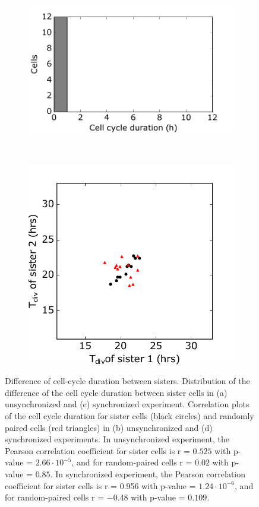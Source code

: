 \documentclass[pdftex,12pt,a4paper]{report}
\begin{document}
\begin{figure}[H]
\centering

\begin{subfigure}{.4\textwidth}
  \centering
  \includegraphics[width=\textwidth]{images/ccd_hist_syn.pdf}
  \caption{}
  \label{fig:ccd_hist_syn}
\end{subfigure}
~
\begin{subfigure}{.4\textwidth}
  \centering
  \includegraphics[width=\textwidth]{images/ccd_scatter_syn.pdf}
  \caption{}
  \label{fig:ccd_scatter_syn}
\end{subfigure}
\caption[Difference of cell-cycle duration between sisters]{Difference of cell-cycle duration between sisters. Distribution of the difference of the cell cycle duration between sister cells in (a) unsynchronized and (c) synchronized experiment. Correlation plots of the cell cycle duration for sister cells (black circles) and randomly paired cells (red  triangles) in (b) unsynchronized and (d) synchronized experiments. In unsynchronized experiment, the Pearson correlation coefficient for sister cells is r = $0.525$ with p-value = $2.66 \cdot 10^{-5}$, and for random-paired cells r = $0.02$ with p-value = $0.85$.  In synchronized experiment, the Pearson correlation coefficient for sister cells is r = 0.956 with p-value = $1.24 \cdot 10^{-6}$, and for random-paired cells r = $-0.48$ with p-value = $0.109$.}

\end{figure}
\end{document}
